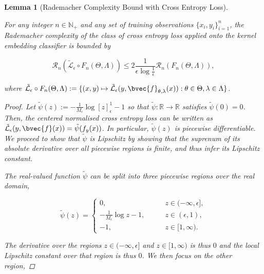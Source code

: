 \documentclass{article}
\newtheorem{lemma}[theorem]{Lemma}
\numberwithin{equation}{section}
\numberwithin{table}{section}
\numberwithin{algorithm}{section}
\begin{document}
		\begin{lemma}[Rademacher Complexity Bound with Cross Entropy Loss]
		\label{thm:rademacher_complexity_bound_with_cross_entropy_loss}
		
			For any integer $n \in \mathbb{N}_{+}$ and any set of training observations $\{x_{i}, y_{i}\}_{i = 1}^{n}$, the Rademacher complexity of the class of cross entropy loss applied onto the kernel embedding classifier is bounded by
			
			\begin{equation}
				\mathcal{R}_{n}(\tilde{\mathcal{L}}_{\epsilon} \circ F_{n}(\Theta, \Lambda)) \leq 2 \frac{1}{\epsilon \log{\frac{1}{\epsilon}}} \mathcal{R}_{n}(F_{n}(\Theta, \Lambda)),
			\label{eq:composed_rademacher_complexity_bound}
			\end{equation}
			
			where $\tilde{\mathcal{L}}_{\epsilon} \circ F_{n}(\Theta, \Lambda) := \{(x, y) \mapsto \tilde{\mathcal{L}}_{\epsilon}(y, \bvec{f}_{\theta, \lambda}(x)) : \theta \in \Theta, \lambda \in \Lambda\}$.
			
			\begin{proof}
				Let $\tilde{\psi}(z) := - \frac{1}{M_{\epsilon}} \log{[z]_{\epsilon}^{1}} - 1$ so that $\tilde{\psi} : \mathbb{R} \to \mathbb{R}$ satisfies $\tilde{\psi}(0) = 0$. Then, the centered normalised cross entropy loss can be written as $\tilde{\mathcal{L}}_{\epsilon}(y, \bvec{f}(x)) = \tilde{\psi}(f_{y}(x))$. In particular, $\tilde{\psi}(z)$ is piecewise differentiable. We proceed to show that $\tilde{\psi}$ is Lipschitz by showing that the suprenum of its absolute derivative over all piecewise regions is finite, and thus infer its Lipschitz constant.
				
				The real-valued function $\tilde{\psi}$ can be split into three piecewise regions over the real domain,
				
				\begin{equation}
					\tilde{\psi}(z) = \begin{cases}
						0, \qquad &z \in (-\infty, \epsilon], \\
						- \frac{1}{M_{\epsilon}}\log{z} - 1, \qquad & z \in (\epsilon, 1), \\
						-1, & z \in [1, \infty).
					\end{cases}
				\end{equation}
				
				The derivative over the regions $z \in (-\infty, \epsilon]$ and $z \in [1, \infty)$ is thus $0$ and the local Lipschitz constant over that region is thus $0$. We then focus on the other region,
				

\end{proof}
\end{lemma}
\end{document}
